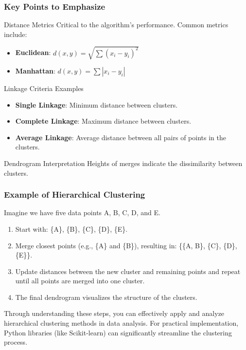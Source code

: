 \documentclass[aspectratio=169]{beamer}
\begin{document}
\begin{frame}[fragile]
    \frametitle{Key Points to Emphasize}
    \begin{block}{Distance Metrics}
        Critical to the algorithm’s performance. Common metrics include:
        \begin{itemize}
            \item \textbf{Euclidean}: \( d(x, y) = \sqrt{\sum (x_i - y_i)^2} \)
            \item \textbf{Manhattan}: \( d(x, y) = \sum |x_i - y_i| \)
        \end{itemize}
    \end{block}
    
    \begin{block}{Linkage Criteria Examples}
        \begin{itemize}
            \item \textbf{Single Linkage}: Minimum distance between clusters.
            \item \textbf{Complete Linkage}: Maximum distance between clusters.
            \item \textbf{Average Linkage}: Average distance between all pairs of points in the clusters.
        \end{itemize}
    \end{block}

    \begin{block}{Dendrogram Interpretation}
        Heights of merges indicate the dissimilarity between clusters.
    \end{block}
\end{frame}

\begin{frame}[fragile]
    \frametitle{Example of Hierarchical Clustering}
    Imagine we have five data points A, B, C, D, and E. 

    \begin{enumerate}
        \item Start with: \{A\}, \{B\}, \{C\}, \{D\}, \{E\}.
        \item Merge closest points (e.g., \{A\} and \{B\}), resulting in: \{\{A, B\}, \{C\}, \{D\}, \{E\}\}.
        \item Update distances between the new cluster and remaining points and repeat until all points are merged into one cluster.
        \item The final dendrogram visualizes the structure of the clusters.
    \end{enumerate}
    
    Through understanding these steps, you can effectively apply and analyze hierarchical clustering methods in data analysis. 
    For practical implementation, Python libraries (like Scikit-learn) can significantly streamline the clustering process.
\end{frame}
\end{document}
